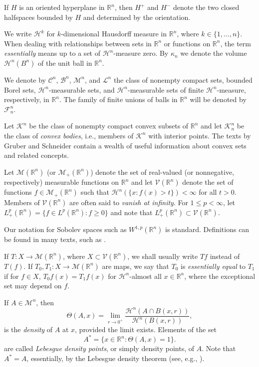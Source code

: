 \documentclass[12pt,reqno]{amsart}
\newcommand{\R}{{\mathbb R}}
\newcommand{\cH}{{\mathcal H}}
\newcommand{\cM}{\mathcal M}
\newcommand{\cF}{\mathcal F}
\newcommand{\cV}{{\mathcal V}}
\numberwithin{equation}{section}
\begin{document}
If $H$ is an oriented hyperplane in $\R^n$, then $H^+$ and $H^-$ denote the two closed halfspaces bounded by $H$ and determined by the orientation.

We write ${\mathcal H}^k$ for $k$-dimensional Hausdorff measure in $\R^n$, where $k\in\{1,\dots, n\}$.  When dealing with relationships between sets in $\R^n$ or functions on $\R^n$, the term {\em essentially} means up to a set of $\cH^n$-measure zero. By $\kappa_n$ we denote the volume ${\mathcal H}^n(B^n)$ of the unit ball in $\R^n$.

We denote by ${\mathcal C}^n$, ${\mathcal B}^n$, ${\mathcal M}^n$, and ${\mathcal L}^n$ the class of nonempty compact sets, bounded Borel sets, ${\mathcal H}^n$-measurable sets, and ${\mathcal H}^n$-measurable sets of finite ${\mathcal H}^n$-measure, respectively, in $\R^n$.  The family of finite unions of balls in $\R^n$ will be denoted by $\cF_n^n$.

Let ${\mathcal K}^n$ be the class of nonempty compact convex subsets of $\R^n$ and let ${\mathcal K}^n_n$ be the class of {\em convex bodies}, i.e., members of ${\mathcal K}^n$ with interior points. The texts by Gruber \cite{Gru07} and Schneider \cite{Sch14} contain a wealth of useful information about convex sets and related concepts.

Let ${\mathcal{M}}(\R^n)$ (or ${\mathcal{M}}_+(\R^n)$) denote the set of real-valued (or nonnegative, respectively) measurable functions on $\R^n$ and let ${\mathcal{V}}(\R^n)$ denote the set of functions $f \in {\mathcal{M}}_+(\R^n)$ such that ${\mathcal{H}}^{n}(\{x:f(x)>t\})<\infty$ for all $t>0$.  Members of ${\mathcal{V}}(\R^n)$ are often said to {\em vanish at infinity}. For $1\le p< \infty$, let $L^p_+(\R^n)=\{f\in L^p(\R^n):f\ge 0\}$ and note that $L^p_+(\R^n)\subset \cV(\R^n)$.

Our notation for Sobolev spaces such as $W^{1,p}(\R^n)$ is standard. Definitions can be found in many texts, such as \cite{LL}.

If $T:X\to \cM(\R^n)$, where $X\subset \cV(\R^n)$, we shall usually write $Tf$ instead of $T(f)$.  If $T_0,T_1:X\to \cM(\R^n)$ are maps, we say that $T_0$ is {\em essentially equal} to $T_1$ if for $f\in X$, $T_0f(x)=T_1f(x)$ for ${\mathcal{H}}^{n}$-almost all $x\in \R^n$, where the exceptional set may depend on $f$.

If $A\in \cM^n$, then
$$
\Theta(A,x)=\lim_{r\to0^+}\frac{\cH^{n}(A\cap B(x,r))}{\cH^n(B(x,r))},
$$
is the {\em density} of $A$ at $x$, provided the limit exists.  Elements of the set
$$
A^*=\{x\in \R^n: \Theta(A,x)=1\}.
$$
are called {\em Lebesgue density points}, or simply density points, of $A$.  Note that $A^*=A$, essentially, by the Lebesgue density theorem (see, e.g., \cite[Theorem~1.5.2]{Pfe}).
\end{document}
